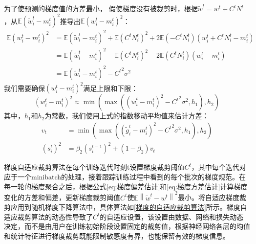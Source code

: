 为了使预测的梯度值的方差最小， 假使梯度没有被裁剪时，根据$\tilde{w}^{t}=w^{t}+C^{t} N^{t}$，从$\mathbb{E}\left(\tilde{w}_{i}^{t}-m_{i}^{t}\right)^{2}$推导出$\mathbb{E}\left(w_{i}^{t}-m_{i}^{t}\right)^{2}$：
$$
\begin{aligned}
\mathbb{E}\left(w_{i}^{t}-m_{i}^{t}\right)^{2} &=\mathbb{E}\left(\tilde{w}_{i}^{t}-m_{i}^{t}\right)^{2}+\mathbb{E}\left(C^{t} N_{i}^{t}\right)^{2}+2 \mathbb{E}\left(-C^{t} N_{i}^{t}\right)\left(w_{i}^{t}+C^{t} N_{i}^{t}-m_{i}^{t}\right) \\
&=\mathbb{E}\left(\tilde{w}_{i}^{t}-m_{i}^{t}\right)^{2}-\mathbb{E}\left(C^{t} N_{i}^{t}\right)^{2}-2 \mathbb{E}\left(C^{t} N_{i}^{t}\right)\left(w_{i}^{t}-m_{i}^{t}\right) \\
&=\mathbb{E}\left(\tilde{w}_{i}^{t}-m_{i}^{t}\right)^{2}-{C^{t}}^{2} \sigma^{2}
\end{aligned}
$$
我们需要确保$\left(w_{i}^{t}-m_{i}^{t}\right)^{2}$满足上限和下限：
$$
\left(w_{i}^{t}-m_{i}^{t}\right)^{2} \approx \min \left(\max \left(\left(\tilde{w}_{i}^{t}-m_{i}^{t}\right)^{2}-{C^{t}}^{2} \sigma^{2}, h_{1}\right), h_{2}\right)
$$
其中，$h_{1}$和$h_{2}$为常数，我们使用上式的指数移动平均值来估计方差：
\begin{equation}\label{eq:梯度方差估计}
\begin{aligned}
v_{t} &=\min \left(\max \left(\left(\tilde{g}_{i}^{t}-m_{i}^{t}\right)^{2}-{C^{t}}^{2} \sigma^{2}, h_{1}\right), h_{2}\right) \\
\left(s_{i}^{t}\right)^{2} &=\beta_{2}\left(s_{i}^{t-1}\right)^{2}+\left(1-\beta_{2}\right) v_{t}
\end{aligned}
\end{equation}

梯度自适应裁剪算法在每个训练迭代时刻t设置梯度裁剪阈值$C^{t}$，其中每个迭代对应于一个minibatch的处理，接着跟踪训练过程中看到的每个批次的梯度规范。在每一轮的梯度聚合之后，根据公式\ref{eq:梯度偏差估计}和\ref{eq:梯度方差估计}计算梯度变化的方差和偏差，更新梯度裁剪阈值$C^{t}$使$\mathbb{E}\left\|\tilde{w}^{t}-w^{t}\right\|^{2}$最小。将自适应梯度裁剪应用到随机梯度下降算法中，具体算法如\ref{梯度的自适应裁剪算法}所示。梯度自适应裁剪算法的动态性导致了$C^{t}$的自适应设置，该设置由数据、网络和损失动态决定，而不是由用户在训练初始阶段设置固定的裁剪值，根据神经网络各层的均值和统计特征进行梯度裁剪既能限制敏感度有界，也能保留有效的梯度信息。

